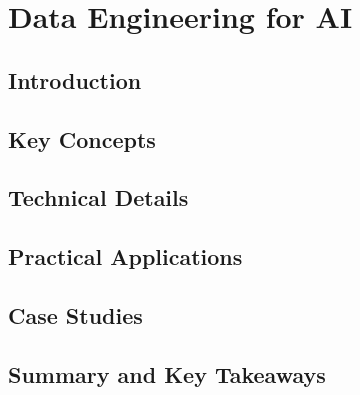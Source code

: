 ﻿%

\chapter{Data Engineering for AI}
\label{ch:chapter-09}

\section{Introduction}


\section{Key Concepts}


\section{Technical Details}


\section{Practical Applications}


\section{Case Studies}


\section{Summary and Key Takeaways}


